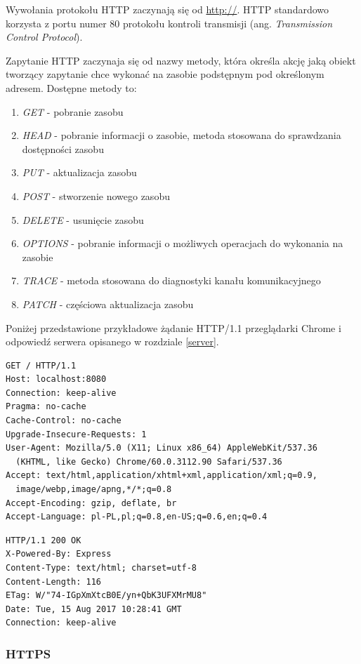 \documentclass[polish, twoside, 12pt]{mwart}
\begin{document}
Wywołania protokołu HTTP zaczynają się od \url{http://}. HTTP standardowo korzysta z portu numer 80 protokołu kontroli transmisji (ang. \emph{Transmission Control Protocol}).

Zapytanie HTTP zaczynaja się od nazwy metody, która określa akcję jaką obiekt tworzący zapytanie chce wykonać na zasobie podstępnym pod określonym adresem. Dostępne metody to:

\begin{enumerate}
  \item \emph{GET} - pobranie zasobu
  \item \emph{HEAD} - pobranie informacji o zasobie, metoda stosowana do sprawdzania dostępności zasobu
  \item \emph{PUT} - aktualizacja zasobu
  \item \emph{POST} - stworzenie nowego zasobu
  \item \emph{DELETE} - usunięcie zasobu
  \item \emph{OPTIONS} - pobranie informacji o możliwych operacjach do wykonania na zasobie
  \item \emph{TRACE} - metoda stosowana do diagnostyki kanału komunikacyjnego
  \item \emph{PATCH} - częściowa aktualizacja zasobu
\end{enumerate}

Poniżej przedstawione przykładowe żądanie HTTP/1.1 przeglądarki Chrome i odpowiedź serwera opisanego w rozdziale \ref{server}.

\begin{lstlisting}[caption=Przykładowe żądanie HTTP/1.1,]
GET / HTTP/1.1
Host: localhost:8080
Connection: keep-alive
Pragma: no-cache
Cache-Control: no-cache
Upgrade-Insecure-Requests: 1
User-Agent: Mozilla/5.0 (X11; Linux x86_64) AppleWebKit/537.36 
  (KHTML, like Gecko) Chrome/60.0.3112.90 Safari/537.36
Accept: text/html,application/xhtml+xml,application/xml;q=0.9,
  image/webp,image/apng,*/*;q=0.8
Accept-Encoding: gzip, deflate, br
Accept-Language: pl-PL,pl;q=0.8,en-US;q=0.6,en;q=0.4
\end{lstlisting}

\begin{lstlisting}[caption=Przykładowa odpowiedź HTTP/1.1]
HTTP/1.1 200 OK
X-Powered-By: Express
Content-Type: text/html; charset=utf-8
Content-Length: 116
ETag: W/"74-IGpXmXtcB0E/yn+QbK3UFXMrMU8"
Date: Tue, 15 Aug 2017 10:28:41 GMT
Connection: keep-alive
\end{lstlisting}

\subsubsection{HTTPS}
\end{document}
